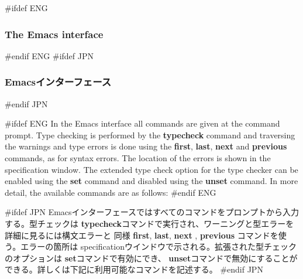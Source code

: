\documentclass[\pformat,12pt]{article}
\begin{document}
#ifdef ENG
\subsubsection{The Emacs interface}
#endif ENG
#ifdef JPN
\subsubsection{Emacsインターフェース}
#endif JPN

#ifdef ENG
In the Emacs interface all commands are given at the command prompt.
Type checking is performed by the \textbf{typecheck} command and
traversing the warnings and type errors is done using the
\textbf{first}, \textbf{last}, \textbf{next} and \textbf{previous}
commands, as for syntax errors. The location of the errors is
shown in the specification window. The extended type check option for
the type checker can be enabled using the \textbf{set} command and
disabled using the \textbf{unset} command. In more detail, the
available commands are as follows:
#endif ENG

#ifdef JPN
Emacsインターフェースではすべてのコマンドをプロンプトから入力する。型チェックは
 \textbf{typecheck}コマンドで実行され、ワーニングと型エラーを詳細に見るには構文エラーと
同様 \textbf{first},  \textbf{last},  \textbf{next} ,  \textbf{previous} コマンドを使う。エラーの箇所は
specificationウインドウで示される。拡張された型チェックのオプションは \textbf{set}コマンドで有効にでき、
 \textbf{unset}コマンドで無効にすることができる。詳しくは下記に利用可能なコマンドを記述する。
#endif JPN
\end{document}
